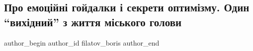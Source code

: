  
 
 
 
 

\subsection{Про емоційні гойдалки і секрети оптимізму.  Один \enquote{вихідний} з життя міського голови}
\label{sec:24_06_2023.fb.filatov_boris.1.pro_emocijni_gojdalky_sekrety_optymizmu_vyhidnyy_z_zhittja_miskogo_golovy}

\ifcmt
 author_begin
   author_id filatov_boris
 author_end
\fi

